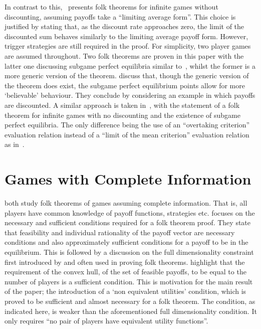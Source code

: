 In contrast to this,~\cite{aumann1976long} presents folk theorems for infinite
games without discounting, assuming payoffs take a ``limiting average form''.
This choice is justified by stating that, as the discount rate approaches zero,
the limit of the discounted sum behaves similarly to the limiting average payoff
form. However, trigger strategies are still required in the proof. For
simplicity, two player games are assumed throughout. Two folk theorems are
proven in this paper with the latter one discussing subgame perfect equilibria
similar to~\cite{Friedman1971}, whilst the former is a more generic version of
the theorem. \cite{aumann1976long} discuss that, though the generic version of
the theorem does exist, the subgame perfect equilibrium points allow for more
`believable' behaviour. They conclude by considering an example in which payoffs
are discounted. A similar approach is taken in~\cite{Rubinstein1979}, with the
statement of a folk theorem for infinite games with no discounting and the
existence of subgame perfect equilibria. The only difference being the use of an
``overtaking criterion'' evaluation relation instead of a ``limit of the mean
criterion'' evaluation relation as in~\cite{aumann1976long}.


\section{Games with Complete Information}\label{sec:Games_with_Complete_Information}
\cite{Abreu1994, Bernergard2019} both study folk theorems of games assuming
complete information. That is, all players have common knowledge of payoff
functions, strategies etc. \cite{Abreu1994} focuses on the necessary and
sufficient conditions required for a folk theorem proof. They state that
feasibility and individual rationality of the payoff vector are necessary
conditions and also approximately sufficient conditions for a payoff to be in
the equilibrium. This is followed by a discussion on the full dimensionality
constraint first introduced by \cite{Fudenberg1986} and often used in proving
folk theorems. \cite{Abreu1994} highlight that the requirement of the convex
hull, of the set of feasible payoffs, to be equal to the number of players is a
sufficient condition. This is motivation for the main result of the paper; the
introduction of a `non equivalent utilities' condition, which is proved to be
sufficient and almost necessary for a folk theorem. The condition, as indicated
here, is weaker than the aforementioned full dimensionality condition. It only
requires ``no pair of players have equivalent utility functions''.

